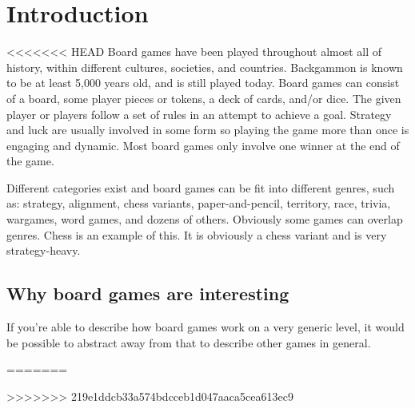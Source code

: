 \chapter{Introduction}
\label{chap:introduction}

<<<<<<< HEAD
Board games have been played throughout almost all of history, within different cultures, societies, and countries. Backgammon is known to be at least 5,000 years old, and is still played today. Board games can consist of a board, some player pieces or tokens, a  deck of cards, and/or dice. The given player or players follow a set of rules in an attempt to achieve a goal. Strategy and luck are usually involved in some form so playing the game more than once is engaging and dynamic. Most board games only involve one winner at the end of the game.

Different categories exist and board games can be fit into different genres, such as: strategy, alignment, chess variants, paper-and-pencil, territory, race, trivia, wargames, word games, and dozens of others. Obviously some games can overlap genres. Chess is an example of this. It is obviously a chess variant and is very strategy-heavy.

\section{Why board games are interesting}
If you're able to describe how board games work on a very generic level, it would be possible to abstract away from that to describe other games in general.

=======

>>>>>>> 219e1ddcb33a574bdcceb1d047aaca5cea613ec9
